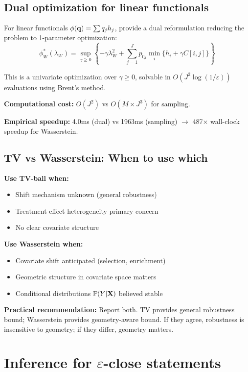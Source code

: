 \documentclass{article}
\newcommand{\PP}{\mathbb{P}}
\begin{document}
\subsection{Dual optimization for linear functionals}

For linear functionals $\phi(\mathbf{q}) = \sum q_j h_j$, \cite{esfahanikuhn2018} provide a dual reformulation reducing the problem to 1-parameter optimization:
\begin{equation}
    \phi_W^*(\lambda_W) = \sup_{\gamma \geq 0} \left\{ -\gamma \lambda_W^2 + \sum_{j=1}^J p_{0j} \min_i \{h_i + \gamma C[i,j]\} \right\}
\end{equation}

This is a univariate optimization over $\gamma \geq 0$, solvable in $O(J^2 \log(1/\varepsilon))$ evaluations using Brent's method.

\textbf{Computational cost:} $O(J^2)$ vs $O(M \times J^3)$ for sampling.

\textbf{Empirical speedup:} 4.0ms (dual) vs 1963ms (sampling) $\rightarrow$ 487$\times$ wall-clock speedup for Wasserstein.

\subsection{TV vs Wasserstein: When to use which}

\textbf{Use TV-ball when:}
\begin{itemize}
    \item Shift mechanism unknown (general robustness)
    \item Treatment effect heterogeneity primary concern
    \item No clear covariate structure
\end{itemize}

\textbf{Use Wasserstein when:}
\begin{itemize}
    \item Covariate shift anticipated (selection, enrichment)
    \item Geometric structure in covariate space matters
    \item Conditional distributions $\PP(Y|\bX)$ believed stable
\end{itemize}

\textbf{Practical recommendation:} Report both. TV provides general robustness bound; Wasserstein provides geometry-aware bound. If they agree, robustness is insensitive to geometry; if they differ, geometry matters.

\section{Inference for $\varepsilon$-close statements}\label{sec:grid}
\end{document}

